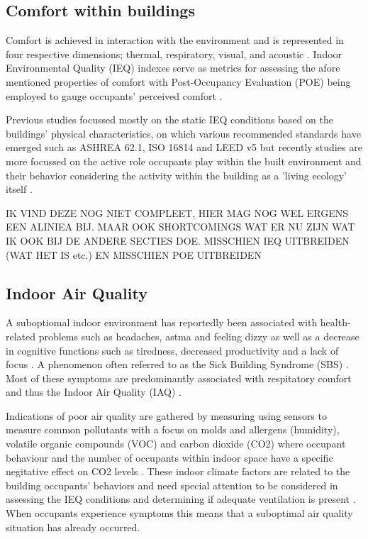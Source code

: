 \subsection{Comfort within buildings}

Comfort is achieved in interaction with the environment and is represented in four respective dimensions; thermal, respiratory, visual, and acoustic \cite{alavi_comfort_2017}. Indoor Environmental Quality (IEQ) \cite{kulshreshtha_indoor_2024} indexes serve as metrics for assessing the afore mentioned properties of comfort with Post-Occupancy Evaluation (POE) \cite{elsayed_post-occupancy_2023} being employed to gauge occupants' perceived comfort \cite{boissonneault_concepts_2023}. 

Previous studies focussed mostly on the static IEQ conditions based on the buildings' physical characteristics, on which various recommended standards have emerged such as ASHREA 62.1, ISO 16814 and LEED v5 but recently studies are more focussed on the active role occupants play within the built environment and their behavior considering the activity within the building as a 'living ecology' itself \cite{langevin_quantifying_2016}. 

IK VIND DEZE NOG NIET COMPLEET, HIER MAG NOG WEL ERGENS EEN ALINIEA BIJ. MAAR OOK SHORTCOMINGS WAT ER NU ZIJN WAT IK OOK BIJ DE ANDERE SECTIES DOE. MISSCHIEN IEQ UITBREIDEN (WAT HET IS etc.) EN MISSCHIEN POE UITBREIDEN

\subsection{Indoor Air Quality}

A suboptiomal indoor environment has reportedly been associated with health-related problems such as headaches, astma and feeling dizzy \cite{klepeis_national_2001} as well as a decrease in cognitive functions such as tiredness, decreased productivity and a lack of focus \cite{wang_how_2021} \cite{du_indoor_2020}. A phenomenon often referred to as the Sick Building Syndrome (SBS) \cite{gawande_indoor_2020, passarelli_sick_2009}. Most of these symptoms are predominantly associated with respitatory comfort and thus the Indoor Air Quality (IAQ) \cite{kim_analyzing_2019}. 

Indications of poor air quality are gathered by measuring using sensors to measure common pollutants with a focus on molds and allergens (humidity), volatile organic compounds (VOC) and carbon dioxide (CO2) where occupant behaviour and the number of occupants within indoor space have a specific negitative effect on CO2 levels \cite{fromme_indoor_2023}. These indoor climate factors are related to the building occupants’ behaviors and need special attention to be considered in assessing the IEQ conditions and determining if adequate ventilation is present \cite{du_indoor_2020}. When occupants experience symptoms this means that a suboptimal air quality situation has already occurred.

